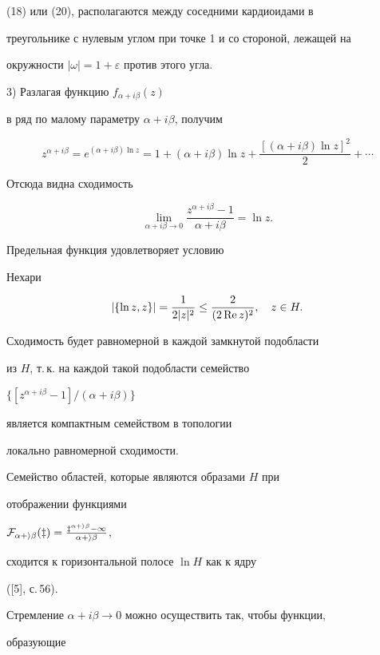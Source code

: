 (18) или (20), располагаются между соседними кардиоидами в 


треугольнике с нулевым углом при точке 1 и со стороной, лежащей на 


окружности $|\omega|=1+\varepsilon$ против этого угла. 


 


3) Разлагая функцию $f_{\alpha+i\beta}(z)$ 


в ряд по малому параметру $\alpha+i\beta$, получим 


$$ 


z^{\alpha+i\beta}=e^{(\alpha+i\beta)\ln z}= 


1+(\alpha+i\beta)\ln z+ 


\frac{[(\alpha+i\beta)\ln z]^2}{2}+\dotsb 


$$ 


Отсюда видна сходимость 


$$ 


\lim_{\alpha+i\beta\to 0} 


\frac{z^{\alpha+i\beta}-1}{\alpha+i\beta}=\ln z. 


$$ 


Предельная функция удовлетворяет условию 


Нехари 


$$ 


|\{\ln z,z\}|=\frac{1}{2|z|^2}\le\frac{2}{(2\re z)^2},\quad 


z\in H. 


$$ 


Сходимость будет равномерной в каждой замкнутой подобласти 


из $H$, т.\,к. на каждой такой подобласти семейство  


$\{[z^{\alpha+i\beta}-1]/(\alpha+i\beta)\}$ 


является компактным семейством в топологии 


локально равномерной сходимости. 


Семейство областей, которые являются образами $H$ при 


отображении функциями 


$\cal F_{\alpha+i\beta}(z)=\frac{z^{\alpha+i\beta}-1}{\alpha+i\beta}$, 


сходится к горизонтальной полосе $\ln H$ как к ядру 


([5], с.\,56). 


Стремление $\alpha+i\beta\to 0$ можно осуществить так, чтобы функции, 


образующие 


